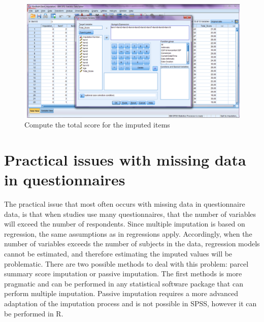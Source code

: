 \documentclass[
]{book}
\begin{document}
\begin{figure}

{\centering \includegraphics[width=0.9\linewidth]{images/fig8.6} 

}

\caption{Compute the total score for the imputed items}\label{fig:fig8-6}
\end{figure}

\hypertarget{practical-issues-with-missing-data-in-questionnaires}{%
\section{Practical issues with missing data in
questionnaires}\label{practical-issues-with-missing-data-in-questionnaires}}

The practical issue that most often occurs with missing data in
questionnaire data, is that when studies use many questionnaires, that
the number of variables will exceed the number of respondents. Since
multiple imputation is based on regression, the same assumptions as in
regressions apply. Accordingly, when the number of variables exceeds the
number of subjects in the data, regression models cannot be estimated,
and therefore estimating the imputed values will be problematic. There
are two possible methods to deal with this problem: parcel summary score
imputation or passive imputation. The first methods is more pragmatic
and can be performed in any statistical software package that can
perform multiple imputation. Passive imputation requires a more advanced
adaptation of the imputation process and is not possible in SPSS,
however it can be performed in R.
\end{document}
